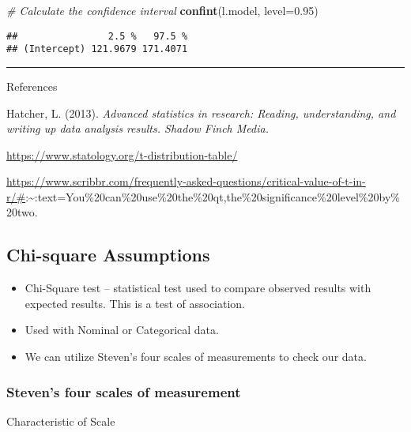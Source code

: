 \documentclass[
]{book}
\newenvironment{Shaded}{\begin{snugshade}}{\end{snugshade}}
\newcommand{\AttributeTok}[1]{\textcolor[rgb]{0.13,0.29,0.53}{#1}}
\newcommand{\CommentTok}[1]{\textcolor[rgb]{0.56,0.35,0.01}{\textit{#1}}}
\newcommand{\FloatTok}[1]{\textcolor[rgb]{0.00,0.00,0.81}{#1}}
\newcommand{\FunctionTok}[1]{\textcolor[rgb]{0.13,0.29,0.53}{\textbf{#1}}}
\newcommand{\NormalTok}[1]{#1}
\providecommand{\tightlist}{%
  \setlength{\itemsep}{0pt}\setlength{\parskip}{0pt}}
\theoremstyle{definition}
\theoremstyle{definition}
\theoremstyle{definition}
\theoremstyle{definition}
\theoremstyle{remark}
\begin{document}
\begin{Shaded}
\begin{Highlighting}[]
\CommentTok{\# Calculate the confidence interval}
\FunctionTok{confint}\NormalTok{(l.model, }\AttributeTok{level=}\FloatTok{0.95}\NormalTok{)}
\end{Highlighting}
\end{Shaded}

\begin{verbatim}
##                2.5 %   97.5 %
## (Intercept) 121.9679 171.4071
\end{verbatim}

\begin{center}\rule{0.5\linewidth}{0.5pt}\end{center}

References

Hatcher, L. (2013). \emph{Advanced statistics in research: Reading, understanding, and writing up data analysis results. Shadow Finch Media.}

\url{https://www.statology.org/t-distribution-table/}

\url{https://www.scribbr.com/frequently-asked-questions/critical-value-of-t-in-r/\#}:\textasciitilde:text=You\%20can\%20use\%20the\%20qt,the\%20significance\%20level\%20by\%20two.

\hypertarget{chi-square-assumptions}{%
\subsection{Chi-square Assumptions}\label{chi-square-assumptions}}

\begin{itemize}
\tightlist
\item
  Chi-Square test -- statistical test used to compare observed results with expected results. This is a test of association.
\item
  Used with Nominal or Categorical data.
\item
  We can utilize Steven's four scales of measurements to check our data.
\end{itemize}

\hypertarget{stevens-four-scales-of-measurement}{%
\subsubsection{Steven's four scales of measurement}\label{stevens-four-scales-of-measurement}}

Characteristic of Scale
\end{document}
